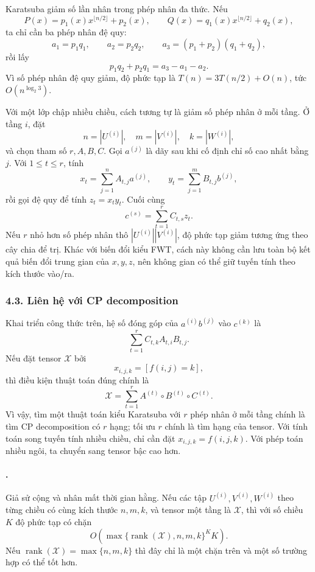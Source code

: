 \documentclass[11pt]{article}
\begin{document}
Karatsuba giảm số lần nhân trong phép nhân đa thức. Nếu
\[
  P(x)=p_1(x)x^{\lfloor n/2\rfloor}+p_2(x),\qquad
  Q(x)=q_1(x)x^{\lfloor n/2\rfloor}+q_2(x),
\]
ta chỉ cần ba phép nhân đệ quy:
\[
  a_1=p_1q_1,\qquad a_2=p_2q_2,\qquad
  a_3=(p_1+p_2)(q_1+q_2),
\]
rồi lấy
\[
  p_1q_2+p_2q_1=a_3-a_1-a_2.
\]
Vì số phép nhân đệ quy giảm, độ phức tạp là \(T(n)=3T(n/2)+O(n)\), tức
\(O(n^{\log_2 3})\).

Với một lớp chập nhiều chiều, cách tương tự là giảm số phép nhân ở mỗi tầng.
Ở tầng \(i\), đặt
\[
  n=|U^{(i)}|,\quad m=|V^{(i)}|,\quad k=|W^{(i)}|,
\]
và chọn tham số \(r,A,B,C\). Gọi \(a^{(j)}\) là dãy sau khi cố định chỉ số
cao nhất bằng \(j\). Với \(1\le t\le r\), tính
\[
  x_t=\sum_{j=1}^{n}A_{t,j}a^{(j)},\qquad
  y_t=\sum_{j=1}^{m}B_{t,j}b^{(j)},
\]
rồi gọi đệ quy để tính \(z_t=x_t y_t\). Cuối cùng
\[
  c^{(s)}=\sum_{t=1}^{r}C_{t,s}z_t.
\]
Nếu \(r\) nhỏ hơn số phép nhân thô \(|U^{(i)}||V^{(i)}|\), độ phức tạp giảm
tương ứng theo cây chia để trị. Khác với biến đổi kiểu FWT, cách này không cần
lưu toàn bộ kết quả biến đổi trung gian của \(x,y,z\), nên không gian có thể
giữ tuyến tính theo kích thước vào/ra.

\subsubsection*{4.3. Liên hệ với CP decomposition}

Khai triển công thức trên, hệ số đóng góp của \(a^{(i)}b^{(j)}\) vào
\(c^{(k)}\) là
\[
  \sum_{t=1}^{r}C_{t,k}A_{t,i}B_{t,j}.
\]
Nếu đặt tensor \(\mathcal X\) bởi
\[
  x_{i,j,k}=[f(i,j)=k],
\]
thì điều kiện thuật toán đúng chính là
\[
  \mathcal X=\sum_{t=1}^{r}A^{(t)}\circ B^{(t)}\circ C^{(t)}.
\]
Vì vậy, tìm một thuật toán kiểu Karatsuba với \(r\) phép nhân ở mỗi tầng chính
là tìm CP decomposition có \(r\) hạng; tối ưu \(r\) chính là tìm hạng của
tensor. Với tính toán song tuyến tính nhiều chiều, chỉ cần đặt
\(x_{i,j,k}=f(i,j,k)\). Với phép toán nhiều ngôi, ta chuyển sang tensor bậc
cao hơn.

\paragraph{.}
Giả sử cộng và nhân mất thời gian hằng. Nếu các tập \(U^{(i)},V^{(i)},W^{(i)}\)
theo từng chiều có cùng kích thước \(n,m,k\), và tensor một tầng là
\(\mathcal X\), thì với số chiều \(K\) độ phức tạp có chặn
\[
  O(\max\{\operatorname{rank}(\mathcal X),n,m,k\}^{K}K).
\]
Nếu \(\operatorname{rank}(\mathcal X)=\max\{n,m,k\}\) thì đây chỉ là một chặn
trên và một số trường hợp có thể tốt hơn.
\end{document}
